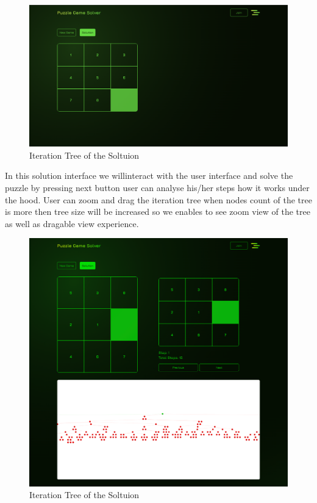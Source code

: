 \documentclass[12pt]{report}
\begin{document}
\begin{figure}[thbp]
    \begin{center}
     \includegraphics[width=1\textwidth]{outputs/home-page.png}
    \end{center}
    \caption{Iteration Tree of the Soltuion}
    \label{fig:home}
 \end{figure}
\newpage\newline In this solution interface we willinteract with the user interface and solve the puzzle by pressing next button user can analyse his/her steps how it works under the hood.\newline\newline
User can zoom and drag the iteration tree when nodes count of the tree is more then tree size will be increased so we enables to see zoom view of the tree as well as dragable view experience.\newline

 \begin{figure}[thbp]
    \begin{center}
     \includegraphics[width=1\textwidth]{outputs/soultion.png}
    \end{center}
    \caption{Iteration Tree of the Soltuion}
    \label{fig:solution}
 \end{figure}
 
\end{document}
